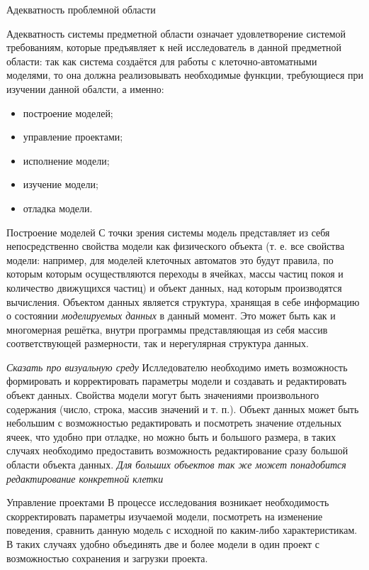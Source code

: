 \documentclass[a4paper,12pt]{extarticle}
\begin{document}
\begin{subsection}{Адекватность проблемной области}
    \label{sec:requirements-adequacy}

    Адекватность системы предметной области означает удовлетворение системой требованиям, которые предъявляет к ней исследователь в данной предметной области: так как система создаётся для работы с клеточно-автоматными моделями, то она должна реализовывать необходимые функции, требующиеся при изучении данной обалсти, а именно:
    \begin{itemize}
        \item построение моделей;
        \item управление проектами;
        \item исполнение модели;
        \item изучение модели;
        \item отладка модели.
    \end{itemize}

    \begin{subsubsection}{Построение моделей}
        С точки зрения системы модель представляет из себя непосредственно свойства модели как физического объекта (т. е. все свойства модели: например, для моделей клеточных автоматов это будут правила, по которым которым осуществляются переходы в ячейках, массы частиц покоя и количество движущихся частиц) и объект данных, над которым производятся вычисления. Объектом данных является структура, хранящая в себе информацию о состоянии \textit{моделируемых данных} в данный момент. Это может быть как и многомерная решётка, внутри программы представляющая из себя массив соответствующей размерности, так и нерегулярная структура данных.
        
        \textit{Сказать про визуальную среду} Ислледователю необходимо иметь возможность формировать и корректировать параметры модели и создавать и редактировать объект данных. Свойства модели могут быть значениями произвольного содержания (число, строка, массив значений и т. п.). Объект данных может быть небольшим с возможностью редактировать и посмотреть значение отдельных ячеек, что удобно при отладке, но можно быть и большого размера, в таких случаях необходимо предоставить возможность редактирование сразу большой области объекта данных. \textit{Для больших объектов так же может понадобится редактирование конкретной клетки}
    \end{subsubsection}
        
    \begin{subsubsection}{Управление проектами}
        В процессе исследования возникает необходимость скорректировать параметры изучаемой модели, посмотреть на изменение поведения, сравнить данную модель с исходной по каким-либо характеристикам. В таких случаях удобно объединять две и более модели в один проект с возможностью сохранения и загрузки проекта. 
        

\end{subsubsection}
\end{subsection}
\end{document}

